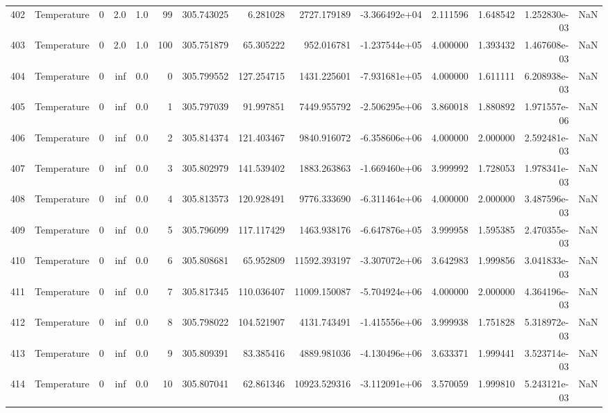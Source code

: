 \begin{tabular}{llrrrrrrrrrrrr}
402 &  Temperature &       0 &  2.0 &  1.0 &   99 &  305.743025 &     6.281028 &    2727.179189 & -3.366492e+04 &  2.111596 &  1.648542 &  1.252830e-03 &      NaN \\
403 &  Temperature &       0 &  2.0 &  1.0 &  100 &  305.751879 &    65.305222 &     952.016781 & -1.237544e+05 &  4.000000 &  1.393432 &  1.467608e-03 &      NaN \\
404 &  Temperature &       0 &  inf &  0.0 &    0 &  305.799552 &   127.254715 &    1431.225601 & -7.931681e+05 &  4.000000 &  1.611111 &  6.208938e-03 &      NaN \\
405 &  Temperature &       0 &  inf &  0.0 &    1 &  305.797039 &    91.997851 &    7449.955792 & -2.506295e+06 &  3.860018 &  1.880892 &  1.971557e-06 &      NaN \\
406 &  Temperature &       0 &  inf &  0.0 &    2 &  305.814374 &   121.403467 &    9840.916072 & -6.358606e+06 &  4.000000 &  2.000000 &  2.592481e-03 &      NaN \\
407 &  Temperature &       0 &  inf &  0.0 &    3 &  305.802979 &   141.539402 &    1883.263863 & -1.669460e+06 &  3.999992 &  1.728053 &  1.978341e-03 &      NaN \\
408 &  Temperature &       0 &  inf &  0.0 &    4 &  305.813573 &   120.928491 &    9776.333690 & -6.311464e+06 &  4.000000 &  2.000000 &  3.487596e-03 &      NaN \\
409 &  Temperature &       0 &  inf &  0.0 &    5 &  305.796099 &   117.117429 &    1463.938176 & -6.647876e+05 &  3.999958 &  1.595385 &  2.470355e-03 &      NaN \\
410 &  Temperature &       0 &  inf &  0.0 &    6 &  305.808681 &    65.952809 &   11592.393197 & -3.307072e+06 &  3.642983 &  1.999856 &  3.041833e-03 &      NaN \\
411 &  Temperature &       0 &  inf &  0.0 &    7 &  305.817345 &   110.036407 &   11009.150087 & -5.704924e+06 &  4.000000 &  2.000000 &  4.364196e-03 &      NaN \\
412 &  Temperature &       0 &  inf &  0.0 &    8 &  305.798022 &   104.521907 &    4131.743491 & -1.415556e+06 &  3.999938 &  1.751828 &  5.318972e-03 &      NaN \\
413 &  Temperature &       0 &  inf &  0.0 &    9 &  305.809391 &    83.385416 &    4889.981036 & -4.130496e+06 &  3.633371 &  1.999441 &  3.523714e-03 &      NaN \\
414 &  Temperature &       0 &  inf &  0.0 &   10 &  305.807041 &    62.861346 &   10923.529316 & -3.112091e+06 &  3.570059 &  1.999810 &  5.243121e-03 &      NaN \\

\end{tabular}
